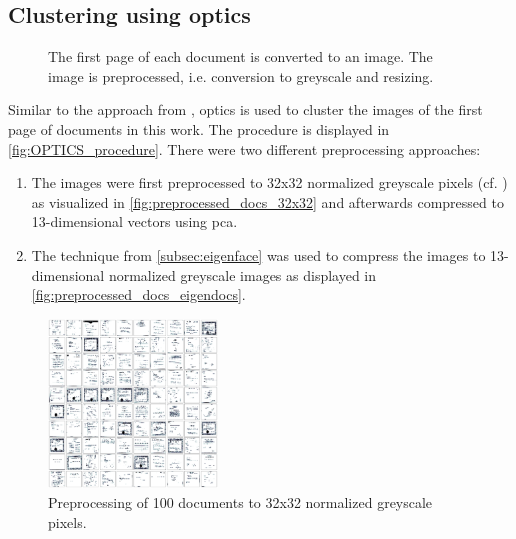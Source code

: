 \subsection{Clustering using \acs*{optics}}\label{subsec:impl-optics}

\begin{figure}[htp] %
    \centering
    
    \caption[\ac{optics} procedure]{The first page of each document is converted to an image.
    The image is preprocessed, i.e. conversion to greyscale and resizing.
    }
    \label{fig:OPTICS_procedure}
\end{figure}

Similar to the approach from \citeauthor{OPTICS1999}, \ac{optics} is used to cluster the images of the first page of documents in this work.
The procedure is displayed in \autoref{fig:OPTICS_procedure}.
There were two different preprocessing approaches:
\begin{enumerate}
    \item \label{pt:32}The images were first preprocessed to 32x32 normalized greyscale pixels (cf. \cite{OPTICS1999}) as visualized in \autoref{fig:preprocessed_docs_32x32}
    and afterwards compressed to 13-dimensional vectors using \ac{pca}.
    \item \label{pt:eigendocs}The technique \eigendocs{} from \autoref{subsec:eigenface} 
    was used to compress the images to 13-dimensional normalized greyscale images as displayed in \autoref{fig:preprocessed_docs_eigendocs}.
\end{enumerate}


\begin{figure}[htp] %
    \centering
    \includegraphics[width=0.4\textwidth]{images/OPTICS/32x32/preprocessed_docs.pdf}
    \caption[Preprocessing to 32x32 normalized greyscale pixels]{Preprocessing of 100 documents to 32x32 normalized greyscale pixels.
    }
    \label{fig:preprocessed_docs_32x32}
\end{figure}


